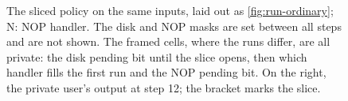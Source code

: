 \begin{figure}[t]
\caption{The sliced policy on the same inputs, laid out as \cref{fig:run-ordinary}; N: NOP handler. The disk and NOP masks are set between all steps and are not shown. The framed cells, where the runs differ, are all private: the disk pending bit until the slice opens, then which handler fills the first run and the NOP pending bit. On the right, the private user's output at step 12; the bracket marks the slice.}
\label{fig:run-sliced}
\end{figure}

